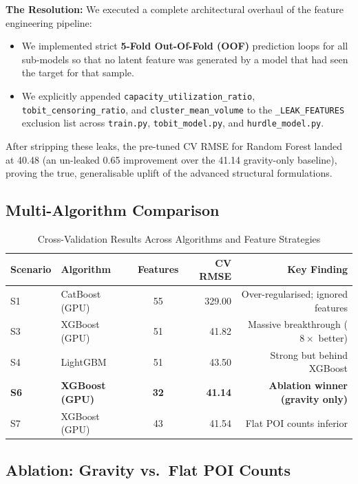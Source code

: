 \documentclass[10.75pt, a4paper]{article}
\begin{document}
\textbf{The Resolution:} 
We executed a complete architectural overhaul of the feature engineering pipeline:
\begin{itemize}
    \item We implemented strict \textbf{5-Fold Out-Of-Fold (OOF)} prediction loops for all sub-models so that no latent feature was generated by a model that had seen the target for that sample.
    \item We explicitly appended \texttt{capacity\_utilization\_ratio}, \texttt{tobit\_censoring\_ratio}, and \texttt{cluster\_mean\_volume} to the \texttt{\_LEAK\_FEATURES} exclusion list across \texttt{train.py}, \texttt{tobit\_model.py}, and \texttt{hurdle\_model.py}.
\end{itemize}

After stripping these leaks, the pre-tuned CV RMSE for Random Forest landed at 40.48 (an un-leaked 0.65 improvement over the 41.14 gravity-only baseline), proving the true, generalisable uplift of the advanced structural formulations.

\subsection{Multi-Algorithm Comparison}

\begin{table}[H]
\centering
\caption{Cross-Validation Results Across Algorithms and Feature Strategies}
\begin{tabular}{llcrr}
\toprule
\textbf{Scenario} & \textbf{Algorithm} & \textbf{Features} & \textbf{CV RMSE} & \textbf{Key Finding} \\
\midrule
S1 & CatBoost (GPU) & 55 & 329.00 & Over-regularised; ignored features \\
S3 & XGBoost (GPU) & 51 & 41.82 & Massive breakthrough ($8\times$ better) \\
S4 & LightGBM & 51 & 43.50 & Strong but behind XGBoost \\
\textbf{S6} & \textbf{XGBoost (GPU)} & \textbf{32} & \textbf{41.14} & \textbf{Ablation winner (gravity only)} \\
S7 & XGBoost (GPU) & 43 & 41.54 & Flat POI counts inferior \\
\bottomrule
\end{tabular}
\end{table}

\subsection{Ablation: Gravity vs.\ Flat POI Counts}
\end{document}
